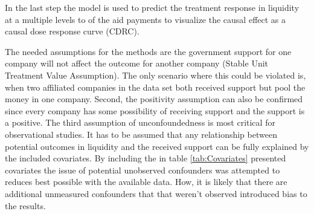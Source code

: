     In the last step the model is used to predict the treatment response in liquidity at a multiple levels to of the aid payments to visualize the causal effect as a causal dose response curve (CDRC).

    The needed assumptions for the methods are the government support for one company will not affect the outcome for another company (Stable Unit Treatment Value Assumption). The only scenario where this could be violated is, when two affiliated companies in the data set both received support but pool the money in one company. Second, the positivity assumption can also be confirmed since every company has some possibility of receiving support and the support is a positive. The third assumption of unconfoundedness is most critical for observational studies. It has to be assumed that any relationship between potential outcomes in liquidity and the received support can be fully explained by the included covariates. By including the in table \ref{tab:Covariates} presented covariates the issue of potential unobserved confounders was attempted to reduces best possible with the available data. How, it is likely that there are additional unmeasured confounders that that weren’t observed introduced bias to the results. 
        